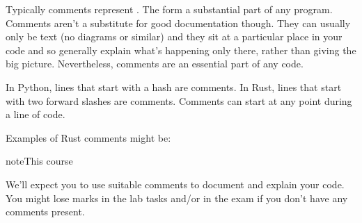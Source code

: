 \documentclass[letterpaper,10pt,british]{sphinxmanual}
\begin{document}
\sphinxAtStartPar
Typically comments represent . The form a substantial part of any program. Comments aren’t a substitute for good documentation though. They can usually only be text (no diagrams or similar) and they sit at a particular place in your code and so generally explain what’s happening only there, rather than giving the big picture. Nevertheless, comments are an essential part of any code.

\sphinxAtStartPar
In Python, lines that start with a hash  are comments. In Rust, lines that start with two forward slashes  are comments. Comments can start at any point during a line of code.

\sphinxAtStartPar
Examples of Rust comments might be:

\begin{sphinxVerbatim}[commandchars=\\\{\}]


\end{sphinxVerbatim}

\begin{sphinxadmonition}{note}{This course}

\sphinxAtStartPar
We’ll expect you to use suitable comments to document and explain your code. You might lose marks in the lab tasks and/or in the exam if you don’t have any comments present.
\end{sphinxadmonition}

\sphinxstepscope
\end{document}
